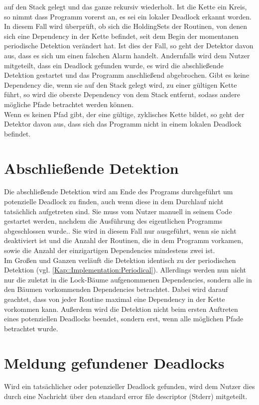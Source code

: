 auf den Stack gelegt und das ganze rekursiv wiederholt. Ist die Kette ein Kreis,
so nimmt dass Programm vorerst an, es sei ein lokaler Deadlock erkannt worden.
In diesem Fall wird überprüft, ob sich die HoldingSets der Routinen, von denen
sich eine Dependency in der Kette befindet, seit dem Begin der momentanen 
periodische Detektion verändert hat. Ist dies der Fall, so geht der Detektor
 davon aus, dass es sich um einen falschen Alarm handelt. Andernfalls 
wird dem Nutzer mitgeteilt, dass ein Deadlock gefunden wurde, es wird die 
abschließende Detektion gestartet und das Programm anschließend abgebrochen.
Gibt es keine Dependency die, wenn sie auf den Stack gelegt wird, zu einer 
gültigen Kette führt, so wird die oberste Dependency von dem Stack entfernt,
sodass andere mögliche Pfade betrachtet werden können.\\
Wenn es keinen Pfad gibt, der eine gültige, zyklisches Kette bildet, so geht 
der Detektor davon aus, dass sich das Programm nicht in einem lokalen Deadlock
befindet.

\section{Abschließende Detektion}
Die abschließende Detektion wird am Ende des Programs durchgeführt um 
potenzielle Deadlock zu finden, auch wenn diese in dem Durchlauf nicht 
tatsächlich aufgetreten sind. Sie muss vom Nutzer manuell in seinem Code 
gestartet werden, nachdem die Ausführung des eigentlichen Programms abgeschlossen 
wurde.. Sie wird in diesem Fall nur ausgeführt, wenn sie nicht 
deaktiviert ist und
 die Anzahl der Routinen, die in dem Programm vorkamen,
sowie die Anzahl der einzigartigen Dependencies mindestens zwei ist.\\
Im Großen und Ganzen verläuft die Detektion 
identisch zu der periodischen Detektion (vgl. \ref{Kap::Implementation:Periodical}).
Allerdings werden nun nicht nur die zuletzt in die Lock-Bäume aufgenommenen 
Dependencies, sondern alle in den Bäumen vorkommenden Dependencies betrachtet. 
Dabei wird darauf geachtet, dass von jeder Routine maximal eine 
Dependency in der Kette vorkommen kann. Außerdem wird die Detektion nicht beim 
ersten Auftreten eines potenziellen Deadlocks beendet, sondern erst, wenn alle 
möglichen Pfade betrachtet wurde.


\section{Meldung gefundener Deadlocks}\label{Kap::Implementation:Report}
Wird ein tatsächlicher oder potenzieller Deadlock gefunden, wird dem Nutzer 
dies durch eine Nachricht über den standard error file descriptor (Stderr)
mitgeteilt.
